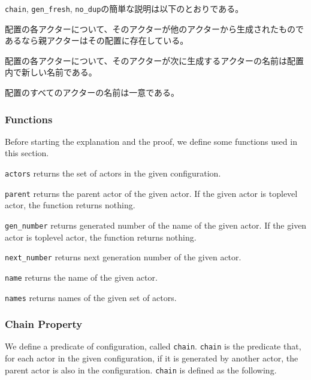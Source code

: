 \texttt{chain}, \texttt{gen\_fresh}, \texttt{no\_dup}の簡単な説明は以下のとおりである。

\begin{description}[style=nextline,leftmargin=12pt,parsep=0pt]
\item[\texttt{chain}]
  配置の各アクターについて、そのアクターが他のアクターから生成されたものであるなら親アクターはその配置に存在している。
\item[\texttt{gen\_fresh}]
  配置の各アクターについて、そのアクターが次に生成するアクターの名前は配置内で新しい名前である。
\item[\texttt{no\_dup}]
  配置のすべてのアクターの名前は一意である。
\end{description}

\subsubsection{Functions}

Before starting the explanation and the proof, we define some functions used in this section.

\begin{description}[style=nextline,leftmargin=12pt,parsep=0pt]
\item[\texttt{actors} $: \textit{Configuration} \rightarrow \textit{Set(Actor)}$]
  \texttt{actors} returns the set of actors in the given configuration.
\item[\texttt{parent} $: \textit{Actor} \rightarrow \textit{Actor}$]
  \texttt{parent} returns the parent actor of the given actor.
  If the given actor is toplevel actor, the function returns nothing. %
\item[\texttt{gen\_number} $: \textit{Actor} \rightarrow \mathbb{N}$]
  \texttt{gen\_number} returns generated number of the name of the given actor.
  If the given actor is toplevel actor, the function returns nothing.
\item[\texttt{next\_number} $: \textit{Actor} \rightarrow \mathbb{N}$]
  \texttt{next\_number} returns next generation number of the given actor.
\item[\texttt{name} $: \textit{Actor} \rightarrow \textit{Name}$]
  \texttt{name} returns the name of the given actor.
\item[\texttt{names} $: \textit{Set(Actor)} \rightarrow \textit{Set(Name)}$]
  \texttt{names} returns names of the given set of actors.
\end{description}

\subsubsection{Chain Property}
We define a predicate of configuration, called \texttt{chain}.
\texttt{chain} is the predicate that, for each actor in the given configuration, if it is generated by another actor, the parent actor is also in the configuration.
\texttt{chain} is defined as the following.

